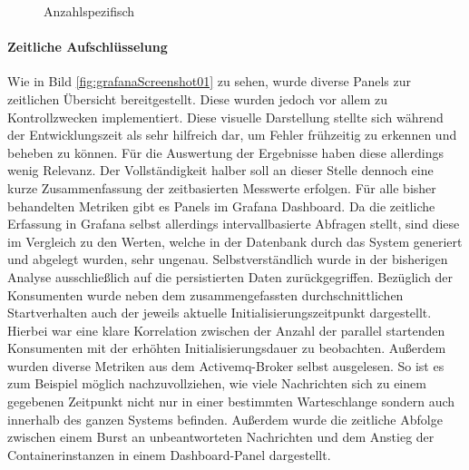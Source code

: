 \begin{figure}
  \centering
  \caption[Startzeit Container - Anzahl spezifisch]{Anzahlspezifisch}
  \label{fig:specContainers}
\end{figure}


\paragraph{Zeitliche Aufschlüsselung \checkmark}
Wie in Bild \ref{fig:grafanaScreenshot01} zu sehen, wurde diverse Panels zur zeitlichen Übersicht bereitgestellt. Diese wurden jedoch vor allem zu Kontrollzwecken implementiert. Diese visuelle Darstellung stellte sich während der Entwicklungszeit als sehr hilfreich dar, um Fehler frühzeitig zu erkennen und beheben zu können. Für die Auswertung der Ergebnisse haben diese allerdings wenig Relevanz. Der Vollständigkeit halber soll an dieser Stelle dennoch eine kurze Zusammenfassung der zeitbasierten Messwerte erfolgen. Für alle bisher behandelten Metriken gibt es Panels im Grafana Dashboard. Da die zeitliche Erfassung in Grafana selbst allerdings intervallbasierte Abfragen stellt, sind diese im Vergleich zu den Werten, welche in der Datenbank durch das System generiert und abgelegt wurden, sehr ungenau. Selbstverständlich wurde in der bisherigen Analyse ausschließlich auf die persistierten Daten zurückgegriffen. Bezüglich der Konsumenten wurde neben dem zusammengefassten durchschnittlichen Startverhalten auch der jeweils aktuelle Initialisierungszeitpunkt dargestellt. Hierbei war eine klare Korrelation zwischen der Anzahl der parallel startenden Konsumenten mit der erhöhten Initialisierungsdauer zu beobachten. Außerdem wurden diverse Metriken aus dem Activemq-Broker selbst ausgelesen. So ist es zum Beispiel möglich nachzuvollziehen, wie viele Nachrichten sich zu einem gegebenen Zeitpunkt nicht nur in einer bestimmten Warteschlange sondern auch innerhalb des ganzen Systems befinden. Außerdem wurde die zeitliche Abfolge zwischen einem Burst an unbeantworteten Nachrichten und dem Anstieg der Containerinstanzen in einem Dashboard-Panel dargestellt.

